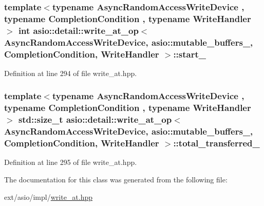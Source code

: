 \subsubsection[{start\+\_\+}]{\setlength{\rightskip}{0pt plus 5cm}template$<$typename Async\+Random\+Access\+Write\+Device , typename Completion\+Condition , typename Write\+Handler $>$ int {\bf asio\+::detail\+::write\+\_\+at\+\_\+op}$<$ Async\+Random\+Access\+Write\+Device,                           {\bf asio\+::mutable\+\_\+buffers\+\_}, Completion\+Condition, Write\+Handler $>$\+::start\+\_\+}\label{classasio_1_1detail_1_1write__at__op_3_01_async_random_access_write_device_00_01_01_01_01_01_01_9c63ca7e3422e806874cb49cd5be5156_a19f19915f7aa362f777f26facddcd022}


Definition at line 294 of file write\+\_\+at.\+hpp.

\hypertarget{classasio_1_1detail_1_1write__at__op_3_01_async_random_access_write_device_00_01_01_01_01_01_01_9c63ca7e3422e806874cb49cd5be5156_a0817b07edb1479593f1814b468d07640}{}
\subsubsection[{total\+\_\+transferred\+\_\+}]{\setlength{\rightskip}{0pt plus 5cm}template$<$typename Async\+Random\+Access\+Write\+Device , typename Completion\+Condition , typename Write\+Handler $>$ std\+::size\+\_\+t {\bf asio\+::detail\+::write\+\_\+at\+\_\+op}$<$ Async\+Random\+Access\+Write\+Device,                           {\bf asio\+::mutable\+\_\+buffers\+\_}, Completion\+Condition, Write\+Handler $>$\+::total\+\_\+transferred\+\_\+}\label{classasio_1_1detail_1_1write__at__op_3_01_async_random_access_write_device_00_01_01_01_01_01_01_9c63ca7e3422e806874cb49cd5be5156_a0817b07edb1479593f1814b468d07640}


Definition at line 295 of file write\+\_\+at.\+hpp.



The documentation for this class was generated from the following file\+:\begin{DoxyCompactItemize}
\item 
ext/asio/impl/\hyperlink{impl_2write__at_8hpp}{write\+\_\+at.\+hpp}\end{DoxyCompactItemize}
